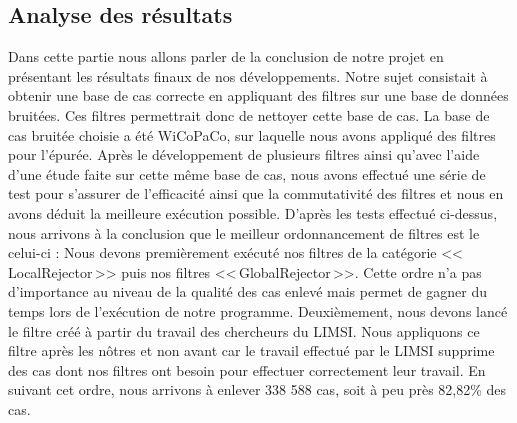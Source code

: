 \documentclass[11pt]{article}
\begin{document}
\subsection{Analyse des r\'{e}sultats}
Dans cette partie nous allons parler de la conclusion de notre projet en pr\'{e}sentant les r\'{e}sultats finaux de nos d\'{e}veloppements. Notre sujet consistait \`{a} obtenir une base de cas correcte en appliquant des filtres sur une base de donn\'{e}es bruit\'{e}es. Ces filtres permettrait donc de nettoyer cette base de cas.
\newline
\newline
	La base de cas bruit\'{e}e choisie a \'{e}t\'{e} WiCoPaCo, sur laquelle nous avons appliqu\'{e} des filtres pour l'\'{e}pur\'{e}e. Apr\`{e}s le d\'{e}veloppement de plusieurs filtres ainsi qu'avec l'aide d'une \'{e}tude faite sur cette m\^{e}me base de cas, nous avons effectu\'{e} une s\'{e}rie de test pour s'assurer de l'efficacit\'{e} ainsi que la commutativit\'{e} des filtres et nous en avons d\'{e}duit la meilleure ex\'{e}cution possible. D'apr\`{e}s les tests effectu\'{e} ci-dessus, nous arrivons \`{a} la conclusion que le meilleur ordonnancement de filtres est le celui-ci : 
\newline
\newline
Nous devons premi\`{e}rement ex\'{e}cut\'{e} nos filtres de la cat\'{e}gorie <<\,LocalRejector\,>> puis nos filtres <<\,GlobalRejector\,>>. Cette ordre n'a pas d'importance au niveau de la qualit\'{e} des cas enlev\'{e} mais permet de gagner du temps lors de l'ex\'{e}cution de notre programme. Deuxi\`{e}mement, nous devons lanc\'{e} le filtre cr\'{e}\'{e} \`{a} partir du travail des chercheurs du LIMSI. Nous appliquons ce filtre apr\`{e}s les nôtres et non avant car le travail effectu\'{e} par le LIMSI supprime des cas dont nos filtres ont besoin pour effectuer correctement leur travail.
\newline
\newline
En suivant cet ordre, nous arrivons \`{a} enlever 338 588 cas, soit \`{a} peu pr\`{e}s 82,82\% des cas.

\end{document}
